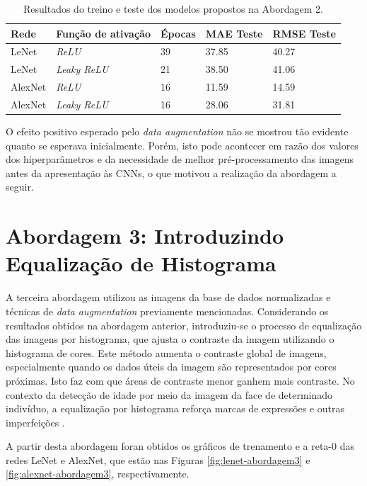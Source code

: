 	\begin{table}[!ht]
		\caption{Resultados do treino e teste dos modelos propostos na Abordagem 2.}
		\label{tab:results2}
		\begin{center}
			\begin{tabular}{l l l l l}
				\toprule
				Rede & Função de ativação & Épocas & MAE Teste & RMSE Teste \\
				\midrule
				LeNet & \emph{ReLU}  & 39 & 37.85 & 40.27 \\
				LeNet & \emph{Leaky ReLU} & 21 & 38.50 & 41.06 \\
				AlexNet & \emph{ReLU}  & 16 & 11.59 & 14.59 \\
				AlexNet & \emph{Leaky ReLU} & 16 & 28.06 & 31.81 \\
				\bottomrule
			\end{tabular}
		\end{center}
	\end{table}

	O efeito positivo esperado pelo \emph{data augmentation} não se mostrou tão evidente quanto se esperava inicialmente. Porém, isto pode acontecer em razão dos valores dos hiperparâmetros e da necessidade de melhor pré-processamento das imagens antes da apresentação às CNNs, o que motivou a realização da abordagem a seguir.

\section{Abordagem 3: Introduzindo Equalização de Histograma}%
	A terceira abordagem utilizou as imagens da base de dados normalizadas e técnicas de \emph{data augmentation} previamente mencionadas. Considerando os resultados obtidos na abordagem anterior, introduziu-se o processo de equalização das imagens por histograma, que ajusta o contraste da imagem utilizando o histograma de cores. Este método aumenta o contraste global de imagens, especialmente quando os dados úteis da imagem são representados por cores próximas. Isto faz com que áreas de contraste menor ganhem mais contraste. No contexto da detecção de idade por meio da imagem da face de determinado indivíduo, a equalização por histograma reforça marcas de expressões e outras imperfeições \cite{acharya2005image}. %

	A partir desta abordagem foran obtidos os gráficos de trenamento e a reta-0 das redes LeNet e AlexNet, que estão nas Figuras \ref{fig:lenet-abordagem3} e \ref{fig:alexnet-abordagem3}, respectivamente.

